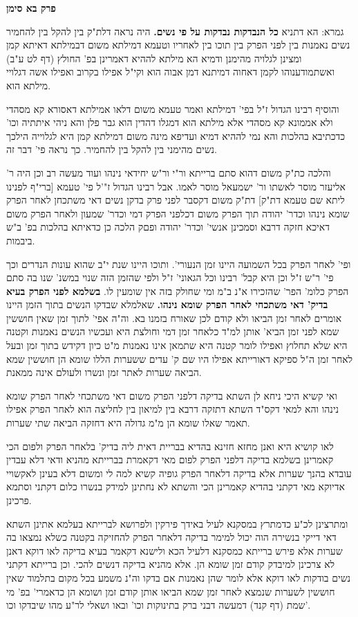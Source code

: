 \documentclass[12pt, openany]{book}
\newcommand{\sethebfont}{
\fontsize{10.5pt}{21.0pt} \selectfont
}
\newcommand{\twocol}[1]{
	{\sethebfont \begin{multicols}{2}
			#1
	\end{multicols}}	
}
\newcommand{\chapname}{}
\newcommand{\newchap}[1]{
	\addcontentsline{toc}{chapter}{#1}
	\renewcommand{\chapname}{#1}
		\begin{center}
			\textbf{%
\fontsize{16pt}{16pt}\selectfont
				#1}
		\end{center}
}
\begin{document}
\newchap{פרק  בא סימן}
\twocol{
גמרא: הא דתניא \textbf{כל הנבדקות נבדקות על פי נשים.}  היה נראה דלת"ק בין להקל בין להחמיר נשים נאמנות בין לפני הפרק בין תוכו בין לאחריו וטעמא דמילתא משום דבמילתא דאיתא קמן ומצינן לגלויה מהימנן ודמיא הא מילתא לההיא דאמרינן בפ' החולץ (דף לט ע"ב) ואשתמודענוהו לקמן דאחוה דמיתנא דמן אבוה הוא וקי"ל אפילו בקרוב ואפילו אשה דגלויי מילתא הוא.\par והוסיף רבינו הגדול ז"ל בפי' דמילתא ואמר טעמא משום דלאו אמילתא דאסורא קא מסהדי ולא אממונא קא מסהדי אלא מילתא הוא דמגלו דהדין הוא גבר פלן והא ניהי איתתיה וכו' כדכתיבא בהלכות והא נמי לההיא דמיא ועדיפא מינה משום דמילתא קמן היא לגלוייה הילכך נשים מהימני בין להקל בין להחמיר. כך נראה פי' דבר זה.\par  והלכה כת"ק משום דהוא סתם ברייתא ור"י ור"ש יחידאי נינהו ועוד מעשה רב וכן היה ר' אליעזר מוסר לאשתו ור' ישמעאל מוסר לאמו. אבל רבינו הגדול ז"'ל פי' טעמא {\small [ברי"ף לפנינו ליתא שם טעמא דת"ק]}  דת"ק משום דקסבר לפני פרק בדקן נשים דאי משתכחן לאחר הפרק שומא נינהו וכדר' יהודה תוך הפרק משום דכלפני הפרק דמי וכדר' שמעון ולאחר הפרק משום דאיכא חזקה דרבא וסמכינן אנשי' וכדר' יהודה ופםק הלכה כן כדאיתא בהלכות בפ' ב"ש ביבמות.\par  ופי' לאחר הפרק בכל השמועה היינו זמן הנעורי'. ותוכו היינו שנת י"ב שהוא עונות הנדרים וכך פי' ר"ש ז"ל וכן היא קבל' רבינו וכל הגאוני' ז"ל ולפי שהזמן הזה שנוי במשנ' שנו בה סתם הפרק כלומ' הפר' שהזכירו א"נ ב"מ ומי שחולק בזה אין שומעין לו. 
\textbf{בשלמא לפני הפרק בעיא בדיק' דאי משתכחי לאחר הפרק שומא נינהו.}  שאלמלא שבדקו הנשים בתוך הזמן היינו אומרים לאחר זמן הביאו ולא קודם לכן שאורח בזמנו בא. וה"ה אפי' לתוך זמן שאין חוששין שמא לפני זמן הביא' אותן למ"ד כלאחר זמן דמי וחולצת היא ועכשיו הנשים נאמנות וקטנה היא שלא תחלוץ ואפילו לומר קטנה היא שתמאן אינו נאמנות מ"ט כיון דקידש בתוך זמן ובעל לאחר זמן ה"ל ספיקא דאורייתא אפילו היו שם ק' עדים ששערות הללו שומא הן חוששין שמא הביאה שערות לאתר זמן ונשרו ולעולם אינה ממאנת.\par ואי קשיא היכי ניחא לן השתא בדיקה דלפני הפרק משום דאי משתכחי לאחר הפרק שומא נינהו והא למאי דקס"ד השתא דתזקה דרבא בין למיאון בין לחליצה הוא לאחר הפרק אפילו תאמר שאלו שומא הן מ"מ גדולה היא דחזקה הביאה שתי שערות.\par  לאו קושיא היא ואנן מחזא חזינא בהדיא בבריית דאית ליה בדיק' בלאחר הפרק ולפום הכי קאמרינן בשלמא בדיקה דלפני הפרק לפום מאי דקאמרת בברייתא מהניא ודאי דלא עבדין עובדא בהנך שערות אלא בדיקה דלאחר הפרק גופיה קשיא למה לי ומשום דלא בעינן לאקשויי אדיוקא מאי דקתני בהדיא קאמרינן הכי והשתא לא נחתינן למידק בנשרו כלום דקתני וסתמא פרכינן.\par  ומתרצינן לכ"ע כדמתרץ במסקנא לעיל באידך פירקין ולפרושא לברייתא בעלמא אתינן השתא דאי דייקי בנשירה הוה יכול למימר בדיקה דלאחר הפרק להחזיקה בקטנה כשלא נמצאו בה שערות אלא פירש ברייתא כמסקנא דלעיל הכא ולישנא דקאמר בעיא בדיקה לאו דוקא דאנן לא צרכינן למיבדק קודם זמן שומא הן. אלא מהניא בדיקה דנשים להכי. וכן ברייתא דקתני נשים בודקות לאו דוקא אלא לומר שהן נאמנות אם בדקו וה"נ משמע בכל מקום בתלמוד שאין חוששין לשערות שנמצא לאחר זמן שמא הביאו אותן קודם זמן ושומא הן כדאמרי' בפ' מי שמת (דף קנד) דמעשה דבני ברק בתינוקות וכו' ובאו ושאלי לר"ע מהו שיבדקו וכו'. 
}
\end{document}
